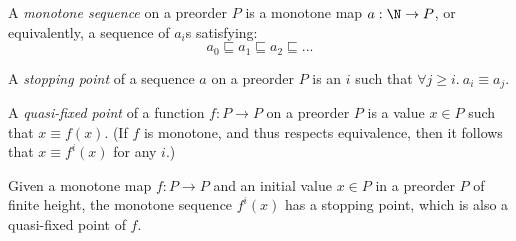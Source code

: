 \documentclass{article}
\newcommand{\ale}{\sqsubseteq}
\newcommand{\eqposet}[1]{\ms{Eq}(#1)}
\renewcommand{\eqposet}[1]{\|{#1}\|}
\newcommand{\eqclass}[1]{[#1]}
\newcommand{\height}{\ms{height}}
\newcommand{\elemheight}[2]{\height(#2 : #1)}
\newcommand{\down}[2]{\mathop{\downarrow}(#2 : #1)}
\begin{document}


\begin{definition}
  A \emph{monotone sequence} on a preorder $P$ is a monotone map $a : \N \to P$,
  or equivalently, a sequence of $a_i$s satisfying:
  \[ a_0 \ale a_1 \ale a_2 \ale ... \]
\end{definition}

\begin{definition}
  A \emph{stopping point} of a sequence $a$ on a preorder $P$ is an $i$ such
  that \(\forall j \ge i.\ a_i \equiv a_j\).
\end{definition}

\begin{definition}
  A \emph{quasi-fixed point} of a function $f : P \to P$ on a preorder $P$ is a
  value $x \in P$ such that $x \equiv f(x)$. (If $f$ is monotone, and thus
  respects equivalence, then it follows that $x \equiv f^i(x)$ for any $i$.)
\end{definition}

\begin{theorem}\label{thm:finiteheight-quasifixed}
  Given a monotone map $f : P \to P$ and an initial value $x \in P$ in a
  preorder $P$ of finite height, the monotone sequence $f^i(x)$ has a stopping
  point, which is also a quasi-fixed point of $f$.
\end{theorem}
\end{document}

